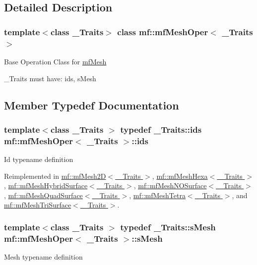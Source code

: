 \subsection{Detailed Description}
\subsubsection*{template$<$class \_\-Traits$>$ class mf::mfMeshOper$<$ \_\-Traits $>$}

Base Operation Class for \hyperlink{classmf_1_1mfMesh}{mfMesh}

\_\-Traits must have: ids, sMesh 

\subsection{Member Typedef Documentation}
\hypertarget{classmf_1_1mfMeshOper_a526d1466339244781fbdc0dbfe5ad210}{
\subsubsection[{ids}]{\setlength{\rightskip}{0pt plus 5cm}template$<$class \_\-Traits $>$ typedef \_\-Traits::ids {\bf mf::mfMeshOper}$<$ \_\-Traits $>$::{\bf ids}}}
\label{classmf_1_1mfMeshOper_a526d1466339244781fbdc0dbfe5ad210}
Id typename definition 

Reimplemented in \hyperlink{classmf_1_1mfMesh2D_a517d508b5d1959b3c697f7c393ccd068}{mf::mfMesh2D$<$ \_\-Traits $>$}, \hyperlink{classmf_1_1mfMeshHexa_ab95eac5745c5efd075cf732421c40d94}{mf::mfMeshHexa$<$ \_\-Traits $>$}, \hyperlink{classmf_1_1mfMeshHybridSurface_a46dd7994ecadd8ead204ab52dcb632ca}{mf::mfMeshHybridSurface$<$ \_\-Traits $>$}, \hyperlink{classmf_1_1mfMeshNOSurface_afee75f2d037d52e9a164fca832091c9b}{mf::mfMeshNOSurface$<$ \_\-Traits $>$}, \hyperlink{classmf_1_1mfMeshQuadSurface_a91f8c5a330192db329f7b2e116b9149d}{mf::mfMeshQuadSurface$<$ \_\-Traits $>$}, \hyperlink{classmf_1_1mfMeshTetra_adbcfde79b2f9076ed56ea0e373508967}{mf::mfMeshTetra$<$ \_\-Traits $>$}, and \hyperlink{classmf_1_1mfMeshTriSurface_a2432b4eb1b385605e96d17e2774519f5}{mf::mfMeshTriSurface$<$ \_\-Traits $>$}.

\hypertarget{classmf_1_1mfMeshOper_a96c05da9a054cf9ac58d15211922f936}{
\subsubsection[{sMesh}]{\setlength{\rightskip}{0pt plus 5cm}template$<$class \_\-Traits $>$ typedef \_\-Traits::sMesh {\bf mf::mfMeshOper}$<$ \_\-Traits $>$::{\bf sMesh}}}
\label{classmf_1_1mfMeshOper_a96c05da9a054cf9ac58d15211922f936}
Mesh typename definition 

